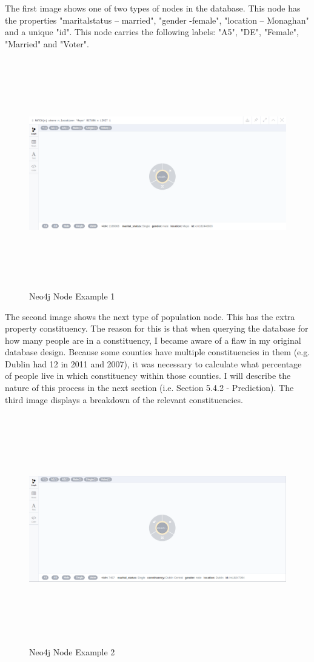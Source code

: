 The first image shows one of two types of nodes in the database. This node has the properties "marital\textunderscore status – married", "gender -female", "location – Monaghan" and a unique "id".  This node carries the following labels: "A5", "DE", "Female", "Married" and "Voter". 
\begin{figure}[h]
	\caption{Neo4j Node Example 1}
	\centering
	\includegraphics[width=15cm, height=10cm]{img/neo4j-noconst}
\end{figure}
\pagebreak

The second image shows the next type of  population node. This has the extra property constituency. The reason for this is that when querying the database for how many people are in a constituency, I became aware of a flaw in my original database design. Because some counties have multiple constituencies in them (e.g. Dublin had 12 in 2011 and 2007), it was necessary to calculate what percentage of people live in which constituency within those counties. I will describe the nature of this process in the next section (i.e. Section 5.4.2 - Prediction). The third image displays a breakdown of the relevant constituencies. 
\begin{figure}[h]
	\caption{Neo4j Node Example 2}
	\centering
	\includegraphics[width=15cm, height=10cm]{img/neo4j-const}
\end{figure}
\pagebreak

